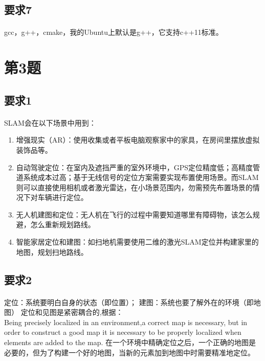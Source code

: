 \documentclass[40pt,a4paper，UTF8]{ctexart}
\begin{document}
\subsection{要求7}
\paragraph{}
gcc，g++，cmake，我的Ubuntu上默认是g++，它支持c++11标准。
\paragraph{}

\section{第3题}

\subsection{要求1} 
\paragraph{}
SLAM会在以下场景中用到：
\begin{enumerate}
\item 增强现实（AR）：使用收集或者平板电脑观察家中的家具，在房间里摆放虚拟装饰品等。
\item 自动驾驶定位：在室内及遮挡严重的室外环境中，GPS定位精度低；高精度管道系统成本过高；基于无线信号的定位方案需要实现布置使用场景。而SLAM则可以直接使用相机或者激光雷达，在小场景范围内，勿需预先布置场景的情况下对车辆进行定位。
\item 无人机建图和定位：无人机在飞行的过程中需要知道哪里有障碍物，该怎么规避，怎么重新规划路线。
\item 智能家居定位和建图：如扫地机需要使用二维的激光SLAM定位并构建家里的地图，规划扫地路线。
\end{enumerate}

\paragraph{}


\subsection{要求2} 
\paragraph{}
定位：系统要明白自身的状态（即位置）；
建图：系统也要了解外在的环境（即地图）
定位和见图是紧密耦合的,根据\cite{ref1}：
\\ Being precisely localized in an environment,a correct map is necessary, but in order to construct a good map it is necessary to be properly localized when elements are added to the map. 在一个环境中精确定位之后，一个正确的地图是必要的，但为了构建一个好的地图，当新的元素加到地图中时需要精准地定位。
\end{document}
